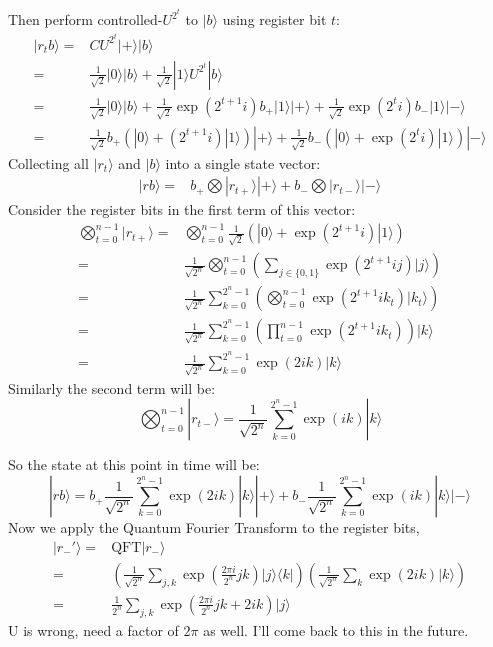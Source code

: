 \documentclass[]{article}
\newcommand{\bra}[1]{\langle #1 |}
\newcommand{\ket}[1]{| #1 \rangle}
\begin{document}
Then perform controlled-$U^{2^t}$ to $\ket{b}$ using register bit $t$:
\begin{align*}
\ket{r_tb}=&CU^{2^t}\ket{+}\ket{b}
\\=& \frac{1}{\sqrt{2}}\ket{0}\ket{b} + \frac{1}{\sqrt{2}}\ket{1}U^{2^t}\ket{b}
\\=& \frac{1}{\sqrt{2}}\ket{0}\ket{b} + \frac{1}{\sqrt{2}}\exp\left(2^{t+1}i\right)b_+\ket{1}\ket{+} + \frac{1}{\sqrt{2}}\exp\left(2^{t}i\right)b_-\ket{1}\ket{-}
\\=& \frac{1}{\sqrt{2}}b_+\left(\ket{0}+\left(2^{t+1}i\right)\ket{1}\right)\ket{+}+\frac{1}{\sqrt{2}}b_-\left(\ket{0}+\exp\left(2^{t}i\right)\ket{1}\right)\ket{-}
\end{align*}
Collecting all $\ket{r_t}$ and $\ket{b}$ into a single state vector:
\begin{align*}
\ket{rb}=&b_+\bigotimes \ket{r_{t+}}\ket{+} + b_-\bigotimes \ket{r_{t-}}\ket{-}
\end{align*}
Consider the register bits in the first term of this vector:
\begin{align*}
\bigotimes_{t=0}^{n-1} \ket{r_{t+}}
=& \bigotimes_{t=0}^{n-1} \frac{1}{\sqrt{2}}\left(\ket{0}+\exp\left(2^{t+1}i\right)\ket{1}\right)
\\=& \frac{1}{\sqrt{2^n}}\bigotimes_{t=0}^{n-1} \left(\sum_{j\in\{0,1\}} \exp\left(2^{t+1}ij\right)\ket{j} \right)
\\=& \frac{1}{\sqrt{2^n}}\sum_{k=0}^{2^n-1}\left(\bigotimes_{t=0}^{n-1} \exp\left(2^{t+1}ik_t\right)\ket{k_t}\right)
\\=& \frac{1}{\sqrt{2^n}}\sum_{k=0}^{2^n-1}\left(\prod_{t=0}^{n-1} \exp\left(2^{t+1}ik_t\right)\right)\ket{k}
\\=& \frac{1}{\sqrt{2^n}}\sum_{k=0}^{2^n-1}\exp\left(2ik\right)\ket{k}
\end{align*}
Similarly the second term will be:
\[\bigotimes_{t=0}^{n-1} \ket{r_{t-}} = \frac{1}{\sqrt{2^n}}\sum_{k=0}^{2^n-1}\exp({ik})\ket{k}\]

So the state at this point in time will be:
\[\ket{rb}=b_+\frac{1}{\sqrt{2^n}}\sum_{k=0}^{2^n-1}\exp(2ik)\ket{k}\ket{+} + b_-\frac{1}{\sqrt{2^n}}\sum_{k=0}^{2^n-1}\exp(ik)\ket{k}\ket{-}\]
Now we apply the Quantum Fourier Transform to the register bits,
\begin{align*}
\ket{r_-'}=&\text{QFT}\ket{r_-}
\\=&\left(\frac{1}{\sqrt{2^n}}\sum_{j,k}\exp\left(\frac{2\pi i}{2^n}jk\right)\ket{j}\bra{k}\right)\left(\frac{1}{\sqrt{2^n}}\sum_{k}\exp\left(2ik\right)\ket{k}\right)
\\=& \frac{1}{2^n}\sum_{j,k}\exp\left(\frac{2\pi i}{2^n}jk+2ik\right)\ket{j}
\end{align*}
U is wrong, need a factor of $2\pi$ as well. I'll come back to this in the future.
\end{document}
